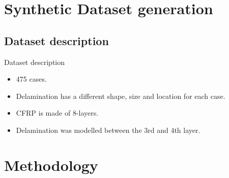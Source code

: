 \documentclass[10pt,aspectratio=169]{beamer} %
\begin{document}
\section{Synthetic Dataset generation}
\subsection{Dataset description}
\setcounter{subfigure}{0}
\begin{frame}{Dataset description}
	\centering
	\begin{minipage}[c]{0.35\textwidth}
		\begin{itemize}[<alert@+>]
			\justifying
			\item 475 cases.
			\item Delamination has a different shape, size and location for each case.
			\item CFRP is made of 8-layers.
			\item Delamination was modelled between the 3rd and 4th layer.			
		\end{itemize}
	\end{minipage}
	\hfill
	\begin{minipage}[c]{0.6\textwidth}
		\begin{figure}
			\centering			
			\qquad
		\end{figure}
	\end{minipage}
\end{frame}

\section{Methodology}
\end{document}
